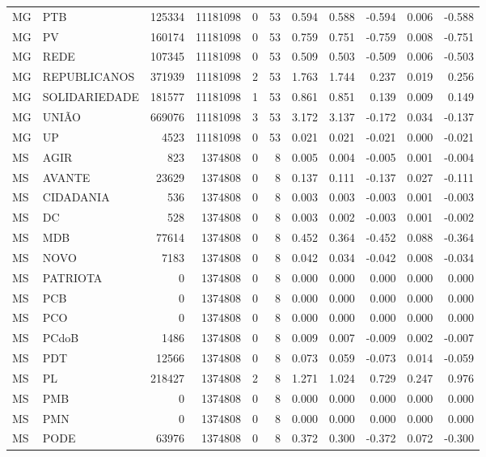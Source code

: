 \begin{landscape}
\begin{longtable}{llrrrrrrrrr}
MG & PTB & 125334 & 11181098 & 0 & 53 & 0.594 & 0.588 & -0.594 & 0.006 & -0.588 \\
MG & PV & 160174 & 11181098 & 0 & 53 & 0.759 & 0.751 & -0.759 & 0.008 & -0.751 \\
MG & REDE & 107345 & 11181098 & 0 & 53 & 0.509 & 0.503 & -0.509 & 0.006 & -0.503 \\
MG & REPUBLICANOS & 371939 & 11181098 & 2 & 53 & 1.763 & 1.744 & 0.237 & 0.019 & 0.256 \\
MG & SOLIDARIEDADE & 181577 & 11181098 & 1 & 53 & 0.861 & 0.851 & 0.139 & 0.009 & 0.149 \\
MG & UNIÃO & 669076 & 11181098 & 3 & 53 & 3.172 & 3.137 & -0.172 & 0.034 & -0.137 \\
MG & UP & 4523 & 11181098 & 0 & 53 & 0.021 & 0.021 & -0.021 & 0.000 & -0.021 \\
MS & AGIR & 823 & 1374808 & 0 & 8 & 0.005 & 0.004 & -0.005 & 0.001 & -0.004 \\
MS & AVANTE & 23629 & 1374808 & 0 & 8 & 0.137 & 0.111 & -0.137 & 0.027 & -0.111 \\
MS & CIDADANIA & 536 & 1374808 & 0 & 8 & 0.003 & 0.003 & -0.003 & 0.001 & -0.003 \\
MS & DC & 528 & 1374808 & 0 & 8 & 0.003 & 0.002 & -0.003 & 0.001 & -0.002 \\
MS & MDB & 77614 & 1374808 & 0 & 8 & 0.452 & 0.364 & -0.452 & 0.088 & -0.364 \\
MS & NOVO & 7183 & 1374808 & 0 & 8 & 0.042 & 0.034 & -0.042 & 0.008 & -0.034 \\
MS & PATRIOTA & 0 & 1374808 & 0 & 8 & 0.000 & 0.000 & 0.000 & 0.000 & 0.000 \\
MS & PCB & 0 & 1374808 & 0 & 8 & 0.000 & 0.000 & 0.000 & 0.000 & 0.000 \\
MS & PCO & 0 & 1374808 & 0 & 8 & 0.000 & 0.000 & 0.000 & 0.000 & 0.000 \\
MS & PCdoB & 1486 & 1374808 & 0 & 8 & 0.009 & 0.007 & -0.009 & 0.002 & -0.007 \\
MS & PDT & 12566 & 1374808 & 0 & 8 & 0.073 & 0.059 & -0.073 & 0.014 & -0.059 \\
MS & PL & 218427 & 1374808 & 2 & 8 & 1.271 & 1.024 & 0.729 & 0.247 & 0.976 \\
MS & PMB & 0 & 1374808 & 0 & 8 & 0.000 & 0.000 & 0.000 & 0.000 & 0.000 \\
MS & PMN & 0 & 1374808 & 0 & 8 & 0.000 & 0.000 & 0.000 & 0.000 & 0.000 \\
MS & PODE & 63976 & 1374808 & 0 & 8 & 0.372 & 0.300 & -0.372 & 0.072 & -0.300 \\

\end{longtable}
\end{landscape}
